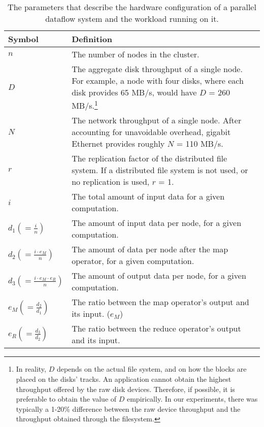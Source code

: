 \documentclass[ 11pt, letterpaper]{article}%
\begin{document}
\begin{table}
\centering
\begin{minipage}{1\textwidth}
\centering
\renewcommand{\arraystretch}{1.2}
\begin{tabular}{|l|p{13cm}|}
\hline
Symbol & Definition \\ \hline
$n$    & The number of nodes in the cluster. \\ \hline
$D$    & The aggregate disk throughput of a single node. For example,
a node with four disks, where each disk provides 65 MB/s, would have $D$ = 260
MB/s.\footnote{In reality, $D$ depends on the actual file system, and on
how the blocks are placed on the disks' tracks. An application cannot obtain
the highest throughput offered by the raw disk devices. Therefore, if possible,
it is preferable to obtain the value of $D$ empirically. In our experiments,
there was typically a 1-20\% difference between the raw device throughput and
the throughput obtained through the filesystem.} \\ \hline $N$ & The network
throughput of a single node. After accounting for unavoidable overhead, gigabit Ethernet provides roughly $N$ = 110 MB/s. \\ \hline $r$    & The replication factor of the distributed file system. If a distributed file system is not used, or no replication is used, $r$ = 1. \\
\hline
$i$    & The total amount of input data for a given computation. \\ \hline
$d_1 \left(=
\frac{i}{n}\right)$  & The amount of input data per node, for a given
computation. \\ \hline $d_2 \left(= \frac{i \cdot e_M}{n}\right)$  & The amount of data per node after
the map operator, for a given computation. \\ \hline
$d_3 \left(= \frac{i \cdot e_M \cdot e_R}{n}\right)$  & The amount of output
data per node, for a given computation. \\ \hline
$e_M \left(=
\frac{d_2}{d_1}\right)$  & The ratio between the map operator's output and
its input. ($e_M $) \\ \hline
$e_R \left(= \frac{d_3}{d_2}\right)$  & The ratio between the
reduce operator's output and its input.\\ \hline

\end{tabular}
\caption{The parameters that describe the hardware configuration of a parallel dataflow system and the workload running on it.}
\label{table:symbols}
\end{minipage}
\end{table}
\end{document}
